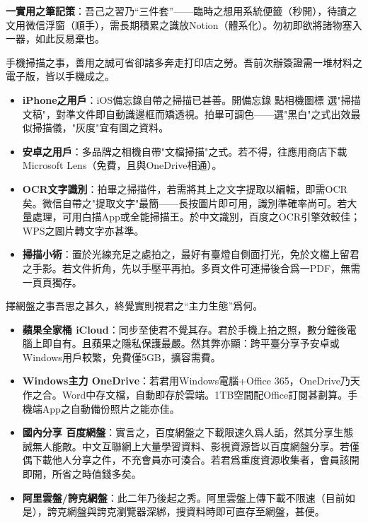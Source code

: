 \textbf{一實用之筆記策}：吾己之習乃“三件套”——臨時之想用系統便籤（秒開），待讀之文用微信浮窗（順手），需長期積累之識放Notion（體系化）。勿初即欲將諸物塞入一器，如此反易棄也。


手機掃描之事，善用之誠可省卻諸多奔走打印店之勞。吾前次辦簽證需一堆材料之電子版，皆以手機成之。

\begin{itemize}
  \item \textbf{iPhone之用戶}：iOS備忘錄自帶之掃描已甚善。開備忘錄 點相機圖標 選"掃描文稿"，對準文件即自動識邊框而矯透視。拍畢可調色——選"黑白"之式出效最似掃描儀，"灰度"宜有圖之資料。
  \item \textbf{安卓之用戶}：多品牌之相機自帶"文檔掃描"之式。若不得，往應用商店下載Microsoft Lens（免費，且與OneDrive相通）。
  \item \textbf{OCR文字識別}：拍畢之掃描件，若需將其上之文字提取以編輯，即需OCR矣。微信自帶之"提取文字"最簡——長按圖片即可用，識別準確率尚可。若大量處理，可用白描App或全能掃描王。於中文識別，百度之OCR引擎效較佳；WPS之圖片轉文字亦甚準。
  \item \textbf{掃描小術}：置於光線充足之處拍之，最好有臺燈自側面打光，免於文檔上留君之手影。若文件折角，先以手壓平再拍。多頁文件可連掃後合爲一PDF，無需一頁頁獨存。
\end{itemize}


擇網盤之事吾思之甚久，終覺實則視君之“主力生態”爲何。

\begin{itemize}
  \item \textbf{蘋果全家桶 iCloud}：同步至使君不覺其存。君於手機上拍之照，數分鐘後電腦上即自有。且蘋果之隱私保護最嚴。然其弊亦顯：跨平臺分享予安卓或Windows用戶較繁，免費僅5GB，擴容需費。
  \item \textbf{Windows主力 OneDrive}：若君用Windows電腦+Office 365，OneDrive乃天作之合。Word中存文檔，自動即存於雲端。1TB空間配Office訂閱甚劃算。手機端App之自動備份照片之能亦佳。
  \item \textbf{國內分享 百度網盤}：實言之，百度網盤之下載限速久爲人詬，然其分享生態誠無人能敵。中文互聯網上大量學習資料、影視資源皆以百度網盤分享。若僅偶下載他人分享之件，不充會員亦可湊合。若君爲重度資源收集者，會員該開即開，所省之時值錢多矣。
  \item \textbf{阿里雲盤/誇克網盤}：此二年乃後起之秀。阿里雲盤上傳下載不限速（目前如是），誇克網盤與誇克瀏覽器深綁，搜資料時即可直存至網盤，甚便。
\end{itemize}

